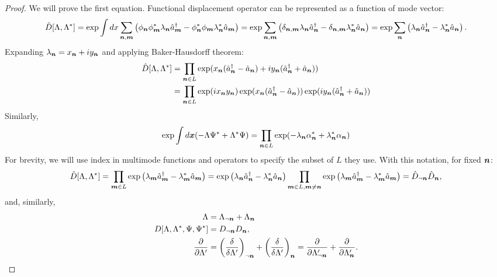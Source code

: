 \begin{proof}
We will prove the first equation.
Functional displacement operator can be represented as a function of mode vector:
\begin{equation*}
\begin{split}
	\hat{D}[\Lambda, \Lambda^*]
	= \exp \int dx \sum_{\boldsymbol{n},\boldsymbol{m}} \left(
		\phi_{\boldsymbol{n}} \phi_{\boldsymbol{m}}^* \lambda_{\boldsymbol{n}} \hat{a}_{\boldsymbol{m}}^\dagger
		- \phi_{\boldsymbol{n}}^* \phi_{\boldsymbol{m}} \lambda_{\boldsymbol{n}}^* \hat{a}_{\boldsymbol{m}}
	\right)
	= \exp \sum_{\boldsymbol{n},\boldsymbol{m}} \left(
		\delta_{\boldsymbol{n},\boldsymbol{m}} \lambda_{\boldsymbol{n}} \hat{a}_{\boldsymbol{n}}^\dagger
		- \delta_{\boldsymbol{n},\boldsymbol{m}} \lambda_{\boldsymbol{n}}^* \hat{a}_{\boldsymbol{n}}
	\right)
	= \exp \sum_{\boldsymbol{n}} \left(
		\lambda_{\boldsymbol{n}} \hat{a}_{\boldsymbol{n}}^\dagger - \lambda_{\boldsymbol{n}}^* \hat{a}_{\boldsymbol{n}}
	\right).
\end{split}
\end{equation*}
Expanding $\lambda_{\boldsymbol{n}} = x_{\boldsymbol{n}} + iy_{\boldsymbol{n}}$ and applying Baker-Hausdorff theorem:
\begin{equation*}
\begin{split}
	\hat{D}[\Lambda, \Lambda^*]
	& = \prod_{\boldsymbol{n} \in L}
		\exp(x_{\boldsymbol{n}}(\hat{a}_{\boldsymbol{n}}^\dagger - \hat{a}_{\boldsymbol{n}})
		+ iy_{\boldsymbol{n}}(\hat{a}_{\boldsymbol{n}}^\dagger + \hat{a}_{\boldsymbol{n}})) \\
	& = \prod_{\boldsymbol{n} \in L}
		\exp(ix_{\boldsymbol{n}}y_{\boldsymbol{n}})
		\exp(x_{\boldsymbol{n}}(\hat{a}_{\boldsymbol{n}}^\dagger - \hat{a}_{\boldsymbol{n}}))
		\exp(iy_{\boldsymbol{n}}(\hat{a}_{\boldsymbol{n}}^\dagger + \hat{a}_{\boldsymbol{n}}))
\end{split}
\end{equation*}
Similarly,
\[
	\exp \int d\boldsymbol{x} (-\Lambda \Psi^* + \Lambda^* \Psi)
	= \prod_{\boldsymbol{n} \in L} \exp
		(-\lambda_{\boldsymbol{n}} \alpha_{\boldsymbol{n}}^* + \lambda_{\boldsymbol{n}}^* \alpha_{\boldsymbol{n}})
\]
For brevity, we will use index in multimode functions and operators to specify the subset of $L$ they use.
With this notation, for fixed $\boldsymbol{n}$:
\[
	\hat{D}[\Lambda, \Lambda^*]
	= \prod_{\boldsymbol{m} \in L} \exp \left(
		\lambda_{\boldsymbol{m}} \hat{a}_{\boldsymbol{m}}^\dagger - \lambda_{\boldsymbol{m}}^* \hat{a}_{\boldsymbol{m}}
	\right)
	= \exp \left(
		\lambda_{\boldsymbol{n}} \hat{a}_{\boldsymbol{n}}^\dagger - \lambda_{\boldsymbol{n}}^* \hat{a}_{\boldsymbol{n}}
	\right)
	\prod_{\boldsymbol{m} \in L, \boldsymbol{m} \ne \boldsymbol{n}} \exp \left(
		\lambda_{\boldsymbol{m}} \hat{a}_{\boldsymbol{m}}^\dagger - \lambda_{\boldsymbol{m}}^* \hat{a}_{\boldsymbol{m}}
	\right)
	= \hat{D}_{\lnot \boldsymbol{n}} \hat{D}_{\boldsymbol{n}},
\]
and, similarly,
\begin{equation*}
\begin{split}
	\Lambda & = \Lambda_{\lnot \boldsymbol{n}} + \Lambda_{\boldsymbol{n}} \\
	D[\Lambda, \Lambda^*, \Psi, \Psi^*]	& = D_{\lnot \boldsymbol{n}} D_{\boldsymbol{n}}, \\
	\frac{\partial}{\partial \Lambda^\prime}
	& = \left( \frac{\delta}{\delta \Lambda^\prime} \right)_{\lnot \boldsymbol{n}}
	+ \left( \frac{\delta}{\delta \Lambda^\prime} \right)_{\boldsymbol{n}}
	= \frac{\partial}{\partial \Lambda_{\lnot \boldsymbol{n}}^\prime}
	+ \frac{\partial}{\partial \Lambda_{\boldsymbol{n}}^\prime}.
\end{split}
\end{equation*}


\end{proof}
